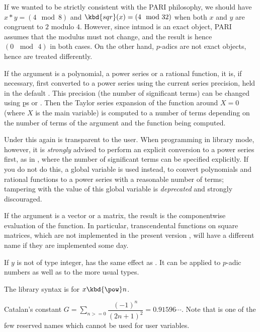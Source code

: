  If we wanted to be strictly consistent with
the PARI philosophy, we should have $x*y = (4 \mod 8)$ and $\kbd{sqr}(x) =
(4 \mod 32)$ when both $x$ and $y$ are congruent to $2$ modulo $4$.
However, since intmod is an exact object, PARI assumes that the modulus
must not change, and the result is hence $(0\, \mod\, 4)$ in both cases. On
the other hand, $p$-adics are not exact objects, hence are treated
differently.

\item If the argument is a polynomial, a power series or a rational function,
it is, if necessary, first converted to a power series using the current
series precision, held in the default . This precision
(the number of significant terms) can be changed using \b{ps} or
. Then the Taylor series expansion of the
function around $X=0$ (where $X$ is the main variable) is computed to a
number of terms depending on the number of terms of the argument and the
function being computed.

Under  this again is transparent to the user. When programming in
library mode, however, it is \emph{strongly} advised to perform an explicit
conversion to a power series first, as in ,
where the number of significant terms  can be specified
explicitly. If you do not do this, a global variable  is used
instead, to convert polynomials and rational functions to a power series with
a reasonable number of terms; tampering with the value of this global
variable is \emph{deprecated} and strongly discouraged.


\item If the argument is a vector or a matrix, the result is the
componentwise evaluation of the function. In particular, transcendental
functions on square matrices, which are not implemented in the present
version \vers, will have a different name if they are implemented some day.

\subseckbd{\pow} If $y$ is not of type integer,  has the same
effect as . It can be applied to $p$-adic numbers as well
as to the more usual types.

The library syntax is 
for $x\hbox{\kbd{\pow}}n$.


\label{se:Catalan}
Catalan's constant $G = \sum_{n>=0}\dfrac{(-1)^n}{(2n+1)^2}=0.91596\cdots$.
Note that  is one of the few reserved names which cannot be
used for user variables.

